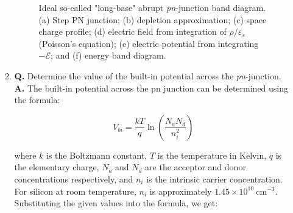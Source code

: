\documentclass[main.tex]{subfiles}
\begin{document}
\begin{enumerate}
\begin{enumerate}
        \begin{figure}
        \centering{}
        \caption{Ideal so-called "long-base" abrupt \textit{pn}-junction band diagram. (a) Step PN junction; (b) depletion approximation; (c) space charge profile; (d) electric field from integration of $\rho / \varepsilon_s$ (Poisson's equation); (e) electric potential from integrating $-\mathscr{E}$; and (f) energy band diagram.}
        \label{fig:18a_a}
        \end{figure}
        
        \item \textbf{Q.} Determine the value of the built-in potential across the \textit{pn}-junction. \textbf{A.} The built-in potential across the pn junction can be determined using the formula:
        
        $$
        V_{b i}=\frac{k T}{q} \ln \left(\frac{N_a N_d}{n_i^2}\right)
        $$
        
        where $k$ is the Boltzmann constant, $T$ is the temperature in Kelvin, $q$ is the elementary charge, $N_a$ and $N_d$ are the acceptor and donor concentrations respectively, and $n_i$ is the intrinsic carrier concentration. For silicon at room temperature, $n_i$ is approximately $1.45 \times 10^{10} \mathrm{~cm}^{-3}$. Substituting the given values into the formula, we get:
        

\end{enumerate}
\end{enumerate}
\end{document}
